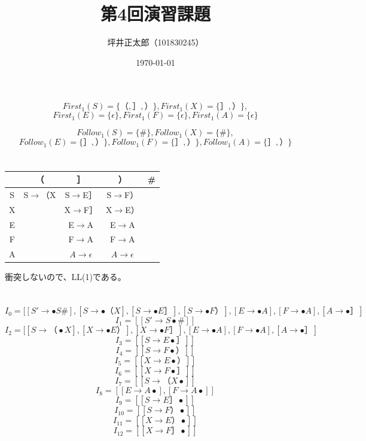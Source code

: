 \documentclass[a4paper,10pt]{jsarticle}
\begin{document}
\title{第4回演習課題}
\author{坪井正太郎（101830245）}
\date{\today}
\maketitle
\section{}
\[First_1(S)=\{（,］,）\},First_1(X)=\{］,）\},\]
\[First_1(E)=\{\epsilon\},First_1(F)=\{\epsilon\},First_1(A)=\{\epsilon\}\]

\[Follow_1(S)=\{\#\},Follow_1(X)=\{\#\},\]
\[Follow_1(E)=\{］,）\},Follow_1(F)=\{］,）\},Follow_1(A)=\{］,）\}\]

\section{}
\begin{table}[H]
  \centering
  \begin{tabular}{|c|c|c|c|c|}\hline
    & （     & {］}                        & ）                          & \# \\\hline
  S & S$\rightarrow $（X & S$\rightarrow $E］                    & S$\rightarrow $F）                      &    \\\hline
  X &       & X$\rightarrow $F］                    & X$\rightarrow $E）                      &    \\\hline
  E &       & E$\rightarrow $A                       & E$\rightarrow $A                       &    \\\hline
  F &       & F$\rightarrow $A                       & F$\rightarrow $A                       &    \\\hline
  A &       & $A\rightarrow \epsilon$ & $A\rightarrow \epsilon$ &   \\\hline
  \end{tabular}
\end{table}
衝突しないので、LL(1)である。

\newpage
\section{}
\[I_0=[[S'\rightarrow \bullet S\#],[S\rightarrow \bullet （X],[S\rightarrow \bullet E］],[S\rightarrow \bullet F）],[E\rightarrow \bullet A],[F\rightarrow \bullet A],[A\rightarrow \bullet］]\]
\[I_1=[[S'\rightarrow S\bullet \#]]\]
\[I_2=[[S\rightarrow （\bullet X],[X\rightarrow \bullet E）],[X\rightarrow \bullet F］],[E\rightarrow \bullet A],[F\rightarrow \bullet A],[A\rightarrow \bullet］]\]
\[I_3=[[S\rightarrow E\bullet ］]]\]
\[I_4=[[S\rightarrow F\bullet ）]]\]
\[I_5=[[X\rightarrow E\bullet ）]]\]
\[I_6=[[X\rightarrow F\bullet ］]]\]
\[I_7=[[S\rightarrow （X\bullet ]]\]
\[I_8=[[E\rightarrow A\bullet ],[F\rightarrow A\bullet ]]\]
\[I_9=[[S\rightarrow E］\bullet ]]\]
\[I_{10}=[[S\rightarrow F）\bullet ]]\]
\[I_{11}=[[X\rightarrow E）\bullet ]]\]
\[I_{12}=[[X\rightarrow F］\bullet ]]\]
\end{document}
